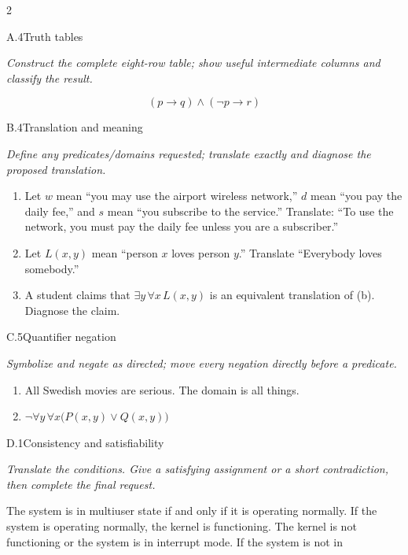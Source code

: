 \documentclass[9pt]{extarticle}
\begin{document}
\begin{multicols}{2}
\begin{CoreProblem}{A.4}{Truth tables}
{\scriptsize\textit{Construct the complete eight-row table; show useful intermediate columns and classify the result.}\par}
\[
  (p\to q)\land(\neg p\to r)
\]
\end{CoreProblem}
\begin{CoreProblem}{B.4}{Translation and meaning}
{\scriptsize\textit{Define any predicates/domains requested; translate exactly and diagnose the proposed translation.}\par}
\begin{enumerate}[label=(\alph*)]
  \item Let $w$ mean ``you may use the airport wireless network,'' $d$ mean
        ``you pay the daily fee,'' and $s$ mean ``you subscribe to the
        service.'' Translate: ``To use the network, you must pay the daily fee
        unless you are a subscriber.''
  \item Let $L(x,y)$ mean ``person $x$ loves person $y$.'' Translate
        ``Everybody loves somebody.''
  \item A student claims that $\exists y\,\forall x\,L(x,y)$ is an equivalent
        translation of (b). Diagnose the claim.
\end{enumerate}
\end{CoreProblem}
\begin{CoreProblem}{C.5}{Quantifier negation}
{\scriptsize\textit{Symbolize and negate as directed; move every negation directly before a predicate.}\par}
\begin{enumerate}[label=(\alph*)]
  \item All Swedish movies are serious. The domain is all things.
  \item $\neg\forall y\,\forall x\bigl(P(x,y)\lor Q(x,y)\bigr)$
\end{enumerate}
\end{CoreProblem}
\columnbreak
\begin{CoreProblem}{D.1}{Consistency and satisfiability}
{\scriptsize\textit{Translate the conditions. Give a satisfying assignment or a short contradiction, then complete the final request.}\par}
The system is in multiuser state if and only if it is operating normally. If
the system is operating normally, the kernel is functioning. The kernel is not
functioning or the system is in interrupt mode. If the system is not in

\end{CoreProblem}
\end{multicols}
\end{document}
